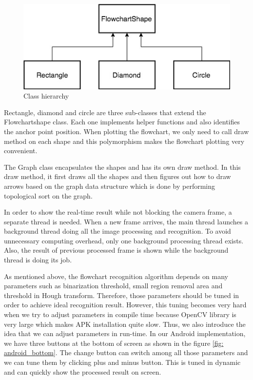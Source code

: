 \documentclass[conference,twocolumn]{IEEEtran}
\begin{document}
\begin{figure}[!htbp]
\begin{center}
\includegraphics[scale=0.5]{class.jpg}
\caption{Class hierarchy}
\label{fig: class_hierachy}
\end{center}
\end{figure}

Rectangle, diamond and circle are three sub-classes that extend the Flowchartshape class. Each one implements helper functions and also identifies the anchor point position. When plotting the flowchart, we only need to call draw method on each shape and this polymorphism makes the flowchart plotting very convenient. 

The Graph class encapsulates the shapes and has its own draw method. In this draw method, it first draws all the shapes and then figures out how to draw arrows based on the graph data structure which is done by performing topological sort on the graph.

In order to show the real-time result while not blocking the camera frame, a separate thread is needed. When a new frame arrives, the main thread launches a background thread doing all the image processing and recognition. To avoid unnecessary computing overhead, only one background processing thread exists. Also, the result of previous processed frame is shown while the background thread is doing its job. 

As mentioned above, the flowchart recognition algorithm depends on many parameters such as binarization threshold, small region removal area and threshold in Hough transform. Therefore, those parameters should be tuned in order to achieve ideal recognition result. However, this tuning becomes very hard when we try to adjust parameters in compile time because OpenCV library is very large which makes APK installation quite slow. Thus, we also introduce the idea that we can adjust parameters in run-time. In our Android implementation, we have three buttons at the bottom of screen as shown in the figure \ref{fig: android_bottom}. The change button can switch among all those parameters and we can tune them by clicking plus and minus button. This is tuned in dynamic and can quickly show the processed result on screen. 
\end{document}
